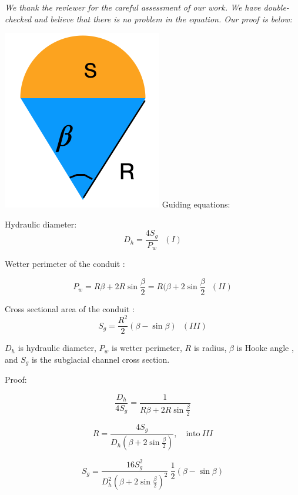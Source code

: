 \documentclass[11pt]{article}
\begin{document}
\begin{itemize}
  \textit{We thank the reviewer for the careful assessment of our work. We have double-checked and believe that there is no problem in the equation. Our proof is below:}

   \includegraphics[width=0.3\linewidth]{Hooke.png}
  Guiding equations:

  Hydraulic diameter:
  \begin{equation}
    D_h = \frac{4S_g}{P_w}~~~(I)
  \end{equation}

  Wetter perimeter of the conduit \citep[][pg. 69]{hooke1990}:
  
  \begin{equation}
    P_w = R \beta +2R \sin\frac{\beta}{2}= R(\beta +2\sin \frac{\beta}{2} ~~~(II)
  \end{equation}


  Cross sectional area of the conduit \citep[][pg. 69]{hooke1990}:
  \begin{equation}
    S_g=\frac{R^2}{2}(\beta - \sin \beta)~~~(III)
  \end{equation}

  $D_h$ is hydraulic diameter, $P_w$ is wetter perimeter, $R$ is radius, $\beta$ is Hooke angle \citep{hooke1990}, and $S_g$ is the subglacial channel cross section.

  Proof:
  
  \begin{linenomath*}
    \begin{equation}
      \frac{D_h}{4S_g} = \frac{1}{R\beta + 2R\sin\frac{\beta}{2}}
    \end{equation}
  \end{linenomath*}

  \begin{equation}
    R = \frac{4S_g}{D_h (\beta +2 \sin \frac{\beta}{2})}, \quad \mathrm{into~} III 
  \end{equation}

  
  \begin{equation}
    S_g = \frac{16 S_g^2}{D_h^2 (\beta +2\sin\frac{\beta}{2})^2} ~\frac{1}{2}(\beta-\sin\beta)
  \end{equation}


\end{itemize}
\end{document}
